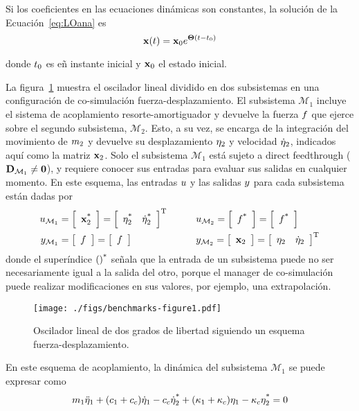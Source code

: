 Si los coeficientes en las ecuaciones dinámicas son constantes, la solución de la Ecuación~\eqref{eq:LOana} es
%
\begin{equation}
	\state (\ctime) = \state_0 e ^{\matLO (\ctime - \ctime_0)}
\end{equation}

donde $\ctime_0$ es eñ instante inicial y $\state_0$ el estado inicial.

La figura~\ref{fig:OsciladorLinealCosim} muestra el oscilador lineal dividido en dos subsistemas en una configuración de co-simulación fuerza-desplazamiento.
El subsistema $\mathcal{M}_1$ incluye el sistema de acoplamiento resorte-amortiguador y devuelve la fuerza $\force$ que ejerce sobre el segundo subsistema, $\mathcal{M}_2$.
Esto, a su vez, se encarga de la integración del movimiento de $\mass_2$ y devuelve su desplazamiento $\displacement_2$ y velocidad $\velocity_2$, indicados aquí como la matriz $\state_2$.
Solo el subsistema $\mathcal{M}_1$ está sujeto a direct feedthrough ($\feedthrough_{\mathcal{M}_1} \neq \zero$), y requiere conocer sus entradas para evaluar sus salidas en cualquier momento.
En este esquema, las entradas $\inputs$ y las salidas $\outputs$ para cada subsistema están dadas por
%
\begin{align}
	\inputs_{\mathcal{M}_1} 
	&= \sqbr{\matr{c}{\state_2\extr}} = \sqbr{\matr{cc}{ \displacement_2\extr & \velocity_2\extr }}\trans 
	&\quad\quad 
	&\inputs_{\mathcal{M}_2} = \sqbr{\matr{c}{ \force\extr }} = \sqbr{\matr{c}{ \forceMod\extr }}
	\notag\\
	\outputs_{\mathcal{M}_1} 
	&= \sqbr{\matr{c}{ \force }} = \sqbr{\matr{c}{ \forceMod }} 
	&\quad\quad 
	&\outputs_{\mathcal{M}_2} = \sqbr{\matr{c}{\state_2}} = \sqbr{\matr{cc}{ \displacement_2 & \velocity_2 }}\trans
\end{align}
%
donde el superíndice $()\extr$ señala que la entrada de un subsistema puede no ser necesariamente igual a la salida del otro, porque el manager de co-simulación puede realizar modificaciones en sus valores, por ejemplo, una extrapolación.


\begin{figure}[ht!]\centering
	\texttt{[image: ./figs/benchmarks-figure1.pdf]}
	\caption{Oscilador lineal de dos grados de libertad siguiendo un esquema fuerza-desplazamiento.}
	\label{fig:OsciladorLinealCosim}
\end{figure}

En este esquema de acoplamiento, la dinámica del subsistema $\mathcal{M}_1$ se puede expresar como
%
\begin{equation}
    \mass_1 \acceleration_1 + (\damping_1 + \damping_c) \velocity_1 -  \damping_c \velocity_2\extr + (\stiffness_1 + \stiffness_c) \displacement_1 - \stiffness_c \displacement_2\extr = 0
\end{equation}

